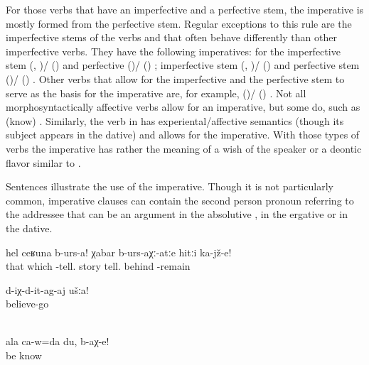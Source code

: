 For those verbs that have an imperfective and a perfective stem, the imperative is mostly formed from the perfective stem. Regular exceptions to this rule are the imperfective stems of the verbs  and  that often behave differently than other imperfective verbs. They have the following imperatives: for the imperfective stem  (, )\slash{} ()  and perfective  ()\slash{} () ; imperfective stem  (, )\slash{} ()  and perfective stem  ()\slash{} () . Other verbs that allow for the imperfective and the perfective stem to serve as the basis for the imperative are, for example,  ()\slash{} () . Not all morphosyntactically affective verbs allow for an imperative, but some do, such as  (know) . Similarly, the verb in  has experiental\slash affective semantics (though its subject appears in the dative) and allows for the imperative. With those types of verbs the imperative has rather the meaning of a wish of the speaker or a deontic flavor similar to .

Sentences  illustrate the use of the imperative. Though it is not particularly common, imperative clauses can contain the second person pronoun referring to the addressee that can be an argument in the absolutive , in the ergative  or in the dative.
%
\begin{exe}
	\ex	\label{ex:‎Tell it like this}
	\gll	hel	ceʁuna	b-urs-a!	χabar		b-urs-aχː-atːe	hitːi	ka-jž-e!\\
		that	which	-tell.	story	tell.	behind	-remain\\
	\glt	{}

	\ex	\label{ex:You pl believe me}
	\gll	d-iχ-d-it-ag-aj	ušːa!\\
		believe-go	\\
		\\
	\glt	{}

	\ex	\label{ex:I am yours, (you) know}
	\gll	ala	ca-w=da	du,	b-aχ-e!\\
			be		know\\
	\glt	{}
\end{exe}

